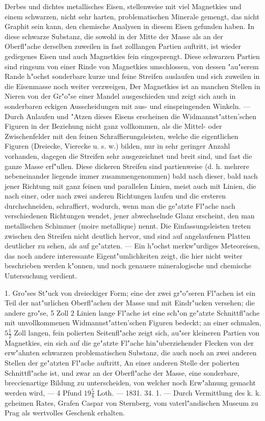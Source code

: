 \documentclass[a4paper, 11pt, oneside, polutonikogreek, german]{article}
\begin{document}
Derbes und dichtes metallisches Eisen, stellenweise mit viel Magnetkies und einem schwarzen, nicht sehr harten, problematischen Minerale gemengt, das nicht Graphit sein kann, den chemische Analysen in diesem Eisen gefunden haben. In diese schwarze Substanz, die sowohl in der Mitte der Masse als an der Oberfl"ache derselben zuweilen in fast zolllangen Partien auftritt, ist wieder gediegenes Eisen und auch Magnetkies fein eingesprengt. Diese schwarzen Partien sind ringsum von einer Rinde von Magnetkies umschlossen, von dessen "au"serem Rande h"ochst sonderbare kurze und feine Streifen auslaufen und sich zuweilen in die Eisenmasse noch weiter verzweigen, Der Magnetkies ist an manchen Stellen in Nieren von der Gr"o"se einer Mandel ausgeschieden und zeigt sich auch in sonderbaren eckigen Ausscheidungen mit aus- und einspringenden Winkeln. --- Durch Anlaufen und "Atzen dieses Eisens erscheinen die Widmannst"atten'schen Figuren in der Beziehung nicht ganz vollkommen, als die Mittel- oder Zwischenfelder mit den feinen Schraffierungsleisten, welche die eigentlichen Figuren (Dreiecke, Vierecke u. s. w.) bilden, nur in sehr geringer Anzahl vorhanden, dagegen die Streifen sehr ausgezeichnet und breit sind, und fast die ganze Masse erf"ullen. Diese dickeren Streifen sind partienweise (d. h. mehrere nebeneinander liegende immer zusammengenommen) bald nach dieser, bald nach jener Richtung mit ganz feinen und parallelen Linien, meist auch mit Linien, die nach einer, oder nach zwei anderen Richtungen laufen und die ersteren durchschneiden, schraffiert, wodurch, wenn man die ge"atzte Fl"ache nach verschiedenen Richtungen wendet, jener abwechselnde Glanz erscheint, den man metallischen Schimmer (moire metallique) nennt. Die Einfassungsleisten treten zwischen den Streifen nicht deutlich hervor, und sind auf angelaufenen Platten deutlicher zu sehen, als auf ge"atzten. --- Ein h"ochst merkw"urdiges Meteoreisen, das noch andere interessante Eigent"umlichkeiten zeigt, die hier nicht weiter beschrieben werden k"onnen, und noch genauere mineralogische und chemische Untersuchung verdient.

1. Gro"ses St"uck von dreieckiger Form; eine der zwei gr"o"seren Fl"achen ist ein Teil der nat"urlichen Oberfl"achen der Masse und mit Eindr"ucken versehen; die andere gro"se, 5 Zoll 2 Linien lange Fl"ache ist eine sch"on ge"atzte Schnittfl"ache mit unvollkommenen Widmannst"atten'schen Figuren bedeckt; an einer schmalen, $5\frac{1}{2}$ Zoll langen, fein polierten Seitenfl"ache zeigt sich, au"ser kleineren Partien von Magnetkies, ein sich auf die ge"atzte Fl"ache hin"uberziehender Flecken von der erw"ahnten schwarzen problematischen Substanz, die auch noch an zwei anderen Stellen der ge"atzten Fl"ache auftritt, An einer anderen Stelle der polierten Schnittfl"ache ist, und zwar an der Oberfl"ache der Masse, eine sonderbare, breccienartige Bildung zu unterscheiden, von welcher noch Erw"ahnung gemacht werden wird, --- 4 Pfund $19\frac{5}{8}$ Loth. --- 1831. 34. 1. --- Durch Vermittlung des k. k. geheimen Rates, Grafen Caspar von Sternberg, vom vaterl"andischen Museum zu Prag als wertvolles Geschenk erhalten.
\end{document}

